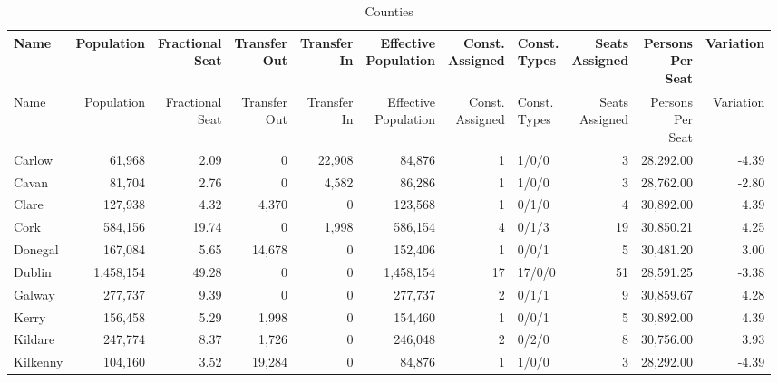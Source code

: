 \documentclass[a4paper]{article}
\begin{document}
\begin{longtable}{lrrrrrrlrrr}
\caption{Counties}
\\ \toprule
Name &Population &\shortstack{Fractional\\Seat} &\shortstack{Transfer\\Out} &\shortstack{Transfer\\In} &\shortstack{Effective\\Population} &\shortstack{Const.\\Assigned} &\shortstack{Const.\\Types} &\shortstack{Seats\\Assigned} &\shortstack{Persons\\Per\\Seat} &Variation \\ \midrule
\endfirsthead
\toprule
Name &Population &\shortstack{Fractional\\Seat} &\shortstack{Transfer\\Out} &\shortstack{Transfer\\In} &\shortstack{Effective\\Population} &\shortstack{Const.\\Assigned} &\shortstack{Const.\\Types} &\shortstack{Seats\\Assigned} &\shortstack{Persons\\Per\\Seat} &Variation \\ \midrule
\endhead
\bottomrule
\endfoot
Carlow&61,968& 2.09&0&22,908&84,876&1&1/0/0&3&28,292.00&-4.39\\ 
Cavan&81,704& 2.76&0&4,582&86,286&1&1/0/0&3&28,762.00&-2.80\\ 
Clare&127,938& 4.32&4,370&0&123,568&1&0/1/0&4&30,892.00& 4.39\\ 
Cork&584,156&19.74&0&1,998&586,154&4&0/1/3&19&30,850.21& 4.25\\ 
Donegal&167,084& 5.65&14,678&0&152,406&1&0/0/1&5&30,481.20& 3.00\\ 
Dublin&1,458,154&49.28&0&0&1,458,154&17&17/0/0&51&28,591.25&-3.38\\ 
Galway&277,737& 9.39&0&0&277,737&2&0/1/1&9&30,859.67& 4.28\\ 
Kerry&156,458& 5.29&1,998&0&154,460&1&0/0/1&5&30,892.00& 4.39\\ 
Kildare&247,774& 8.37&1,726&0&246,048&2&0/2/0&8&30,756.00& 3.93\\ 
Kilkenny&104,160& 3.52&19,284&0&84,876&1&1/0/0&3&28,292.00&-4.39\\ 

\end{longtable}
\end{document}
